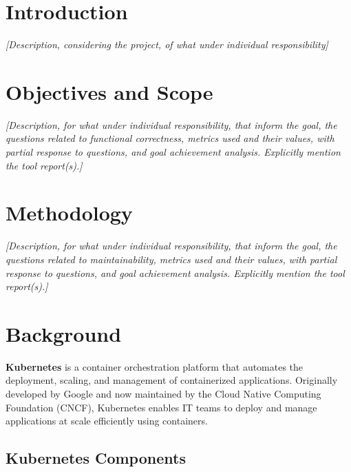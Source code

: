 \documentclass[a4paper,11pt,openright,BCOR=15mm]{scrbook}
\begin{document}
	
	
	
	\tableofcontents
	\listoffigures
	
	
	
	
	\mainmatter 
	
	

	\chapter{Introduction}
	
\textit{[Description, considering the project, of what under individual responsibility]}
	
	\chapter{Objectives and Scope}

\textit{	[Description, for what under individual responsibility, that inform the goal, the questions related to functional correctness, metrics used and their values, with partial response to questions, and goal achievement analysis. Explicitly mention the tool report(s).]}

	
	\chapter{Methodology}
\textit{	[Description, for what under individual responsibility, that inform the goal, the questions related to maintainability, metrics used and their values, with partial response to questions, and goal achievement analysis. Explicitly mention the tool report(s).]}
	
	


\chapter{Background}

\textbf{Kubernetes} is a container orchestration platform that automates the deployment, scaling, and management of containerized applications. Originally developed by Google and now maintained by the Cloud Native Computing Foundation (CNCF), Kubernetes enables IT teams to deploy and manage applications at scale efficiently using containers.


\section{Kubernetes Components}
\end{document}
